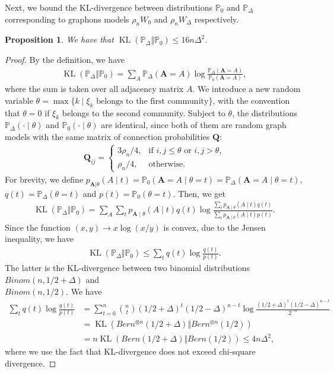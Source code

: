 \documentclass[11pt]{article}
\renewcommand{\P}{\mathbb{P}}
\newcommand{\bA}{\bm{A}}
\newcommand{\bQ}{\bm{Q}}
\newcommand{\KL}[2]{\operatorname{KL}\left (#1\Vert #2 \right )}
\newcommand{\<}{\langle}
\renewcommand{\>}{\rangle}
\theoremstyle{plain}
\newtheorem{prop}{Proposition}
\theoremstyle{definition}
\theoremstyle{remark}
\begin{document}
{Next, we bound the KL-divergence between distributions $\P_0$ and $\P_{\Delta}$ corresponding to graphons models $\rho_n W_0$ and $\rho_n W_{\Delta}$ respectively.
\begin{prop}
    \label{prop:KL bound}
    We have that $\KL{\P_{\Delta}}{\P_0} \le 16 n \Delta^2$.
\end{prop}
\begin{proof}
By the definition, we have
\begin{align*}
    \KL{\P_{\Delta}}{\P_0} = \sum_{A} \P_{\Delta}(\bA = A) \log \frac{\P_{\Delta}(\bA = A)}{\P_0(\bA = A)},
\end{align*}
where the sum is taken over all adjacency matrix $A$.
We introduce a new random variable $\theta = \max \{ k \mid \xi_{k} \text{ belongs to the first community}  \}$, with the convention that $\theta=0$ if $\xi_{k}$ belongs to the second community.  Subject to $\theta$, the distributions $\P_{\Delta} (\cdot \mid \theta)$ and $\P_0 (\cdot \mid \theta)$ are identical, since both of them are random graph models with the same matrix of connection probabilities $\bQ$:
\begin{align*}
    \bQ_{ij} = 
    \begin{cases}
        3\rho_n/4 , & \text{if $i, j \le \theta$ or $i, j > \theta$,} \\
        \rho_n/4 , & \text{otherwise.}
    \end{cases}
\end{align*}
For brevity, we define $p_{\bA | \theta}(A \mid t) = \P_0 (\bA = A \mid \theta = t) = \P_{\Delta} (\bA = A \mid \theta = t)$, $q(t) = \P_{\Delta}(\theta = t)$ and $p(t) = \P_{0}(\theta = t)$. Then, we get
\begin{align*}
    \KL{\P_{\Delta}}{\P_0} = \sum_{A} \sum_t p_{\bA \mid \theta}(A \mid t) q(t) \log \frac{\sum_{t} p_{\bA \mid \theta}(A \mid t) q(t)}{\sum_t p_{\bA \mid \theta} (A \mid t) p(t)}.
\end{align*}
Since the function $(x, y) \to x \log (x / y)$ is convex, due to the Jensen inequality, we have
\begin{align*}
    \KL {\P_{\Delta}}{\P_0} \le \sum_{t} q(t) \log \frac{q(t)}{p(t)}.
\end{align*}
The latter is the KL-divergence between two binomial distributions $Binom(n, 1/2 + \Delta)$ and \\$Binom(n, 1/2)$. We have
\begin{align*}
    \sum_{t} q(t) \log \frac{q(t)}{p(t)} & = \sum_{t = 0}^n \binom{n}{t}(1/2 + \Delta)^t (1/2 - \Delta)^{n - t} \log \frac{(1/2 + \Delta)^t (1/2 - \Delta)^{n - t}}{2^{-n}}  \\
    & = \KL{Bern^{\otimes n}(1/2 + \Delta)}{Bern^{\otimes n}(1/2)} \\
    & = n \KL{Bern(1/2 + \Delta)}{Bern(1/2)} \le {4} n \Delta^2,
\end{align*}
where we use the fact that KL-divergence does not exceed chi-square divergence.
\end{proof}

}
\end{document}
